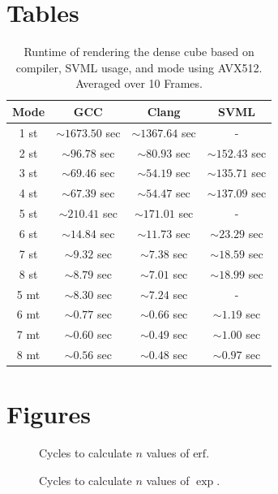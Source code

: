 \documentclass[a4paper, 11pt]{memoir}
\newcommand*{\erf}{\text{erf}}
\begin{document}
    \chapter{Tables}
    \label{ch:tables}
    \begin{table}[H]
        \centering
        \begin{tabular}{|c | c | c | c|}
            \hline
            Mode & GCC               & Clang             & SVML\\\hline
            1 st & $\sim1673.50$ sec & $\sim1367.64$ sec & - \\
            2 st & $\sim96.78$ sec   & $\sim80.93$ sec   & $\sim152.43$ sec\\
            3 st & $\sim69.46$ sec   & $\sim54.19$ sec   & $\sim135.71$ sec\\
            4 st & $\sim67.39$ sec   & $\sim54.47$ sec   & $\sim137.09$ sec\\
            5 st & $\sim210.41$ sec  & $\sim171.01$ sec  & - \\
            6 st & $\sim14.84$ sec   & $\sim11.73$ sec   & $\sim23.29$ sec\\
            7 st & $\sim9.32$ sec    & $\sim7.38$ sec    & $\sim18.59$ sec\\
            8 st & $\sim8.79$ sec    & $\sim7.01$ sec    & $\sim18.99$ sec\\\hline\hline

            5 mt & $\sim8.30$ sec    & $\sim7.24$ sec    & - \\
            6 mt & $\sim0.77$ sec    & $\sim0.66$ sec    & $\sim1.19$ sec\\
            7 mt & $\sim0.60$ sec    & $\sim0.49$ sec    & $\sim1.00$ sec\\
            8 mt & $\sim0.56$ sec    & $\sim0.48$ sec    & $\sim0.97$ sec\\
            \hline
        \end{tabular}
        \caption{Runtime of rendering the dense cube based on compiler, SVML usage, and mode using AVX512. Averaged over 10 Frames.}
        \label{tab:perf_dense_cube_avx512}
    \end{table}

    \chapter{Figures}
    \begin{figure}[H]
        \centering
        
        \caption{Cycles to calculate $n$ values of $\erf$.}
    \end{figure}
    \begin{figure}[H]
        \centering
        
        \caption{Cycles to calculate $n$ values of $\exp$.}
    \end{figure}
    
\end{document}
